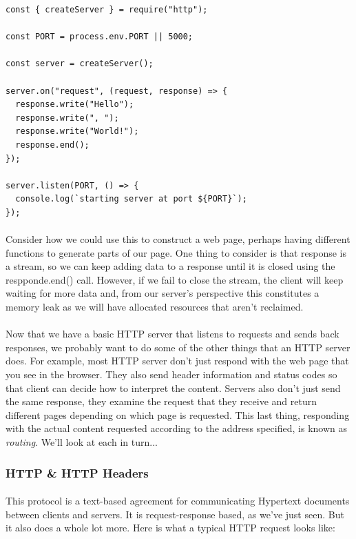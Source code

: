 \documentclass[10pt, a4paper, twosize]{article}
\begin{document}
\begin{lstlisting}
const { createServer } = require("http");

const PORT = process.env.PORT || 5000;

const server = createServer();

server.on("request", (request, response) => {
  response.write("Hello");
  response.write(", ");
  response.write("World!");
  response.end();
});

server.listen(PORT, () => {
  console.log(`starting server at port ${PORT}`);
});
\end{lstlisting}

\paragraph{} Consider how we could use this to construct a web page, perhaps having different functions to generate parts of our page. One thing to consider is that response is a stream, so we can keep adding data to a response until it is closed using the respponde.end() call. However, if we fail to close the stream, the client will keep waiting for more data and, from our server's perspective this constitutes a memory leak as we will have allocated resources that aren't reclaimed.

\paragraph{} Now that we have a basic HTTP server that listens to requests and sends back responses, we probably want to do some of the other things that an HTTP server does. For example, most HTTP server don't just respond with the web page that you see in the browser. They also send header information and status codes so that client can decide how to interpret the content. Servers also don't just send the same response, they examine the request that they receive and return different pages depending on which page is requested. This last thing, responding with the actual content requested according to the address specified, is known as \emph{routing}. We'll look at each in turn...


\subsubsection{HTTP \& HTTP Headers}
\paragraph{} This protocol is a text-based agreement for communicating Hypertext documents between clients and servers. It is request-response based, as we've just seen. But it also does a whole lot more. Here is what a typical HTTP request looks like:
\end{document}
